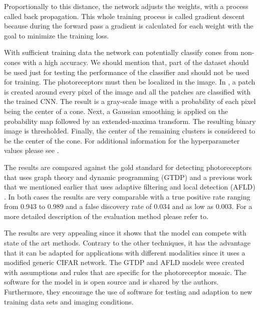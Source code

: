 \documentclass[]{article}
\begin{document}
Proportionally to this distance, the network adjusts the weights, with a process called back propagation.
This whole training process is called gradient descent because during the forward pass a gradient is calculated for each weight with the goal to minimize the training loss.

With sufficient training data the network can potentially classify cones from non-cones with a high accuracy.
We should mention that, part of the dataset should be used just for testing the performance of the classifier and should not be used for training.
The photoreceptors must then be localized in the image.
In \cite{cunefare_open_2017}, a patch is created around every pixel of the image and all the patches are classified with the trained CNN.
The result is a gray-scale image with a probability of each pixel being the center of a cone.
Next, a Gaussian smoothing is applied on the probability map followed by an extended-maxima transform.
The resulting binary image is thresholded.
Finally, the center of the remaining clusters is considered to be the center of the cone.
For additional information for the hyperparameter values please see \cite{cunefare_open_2017}.

The results are compared against the gold standard for detecting photoreceptors that uses graph theory and dynamic programming (GTDP) and a previous work
that we mentioned earlier that uses adaptive filtering and local detection (AFLD) \cite{cunefare_automatic_2016}.
In both cases the  results are very comparable with a true positive rate ranging from 0.943 to 0.989 and a false discovery rate of 0.034 and as low as 0.003.
For a more detailed description of the evaluation method please refer to\cite{cunefare_open_2017}.

The results are very appealing since it shows that the model can compete with state of the art methods.
Contrary to the other techniques, it has the advantage that it can be adapted for applications with different modalities since it uses a modified generic CIFAR network.
The GTDP and AFLD models were created with assumptions and rules that are specific for the photoreceptor mosaic.
The software for the  model in\cite{cunefare_automatic_2016} is open source and is shared by the authors.
Furthermore, they encourage the use of software for testing and adaption to new training data sets and imaging conditions.
\end{document}

